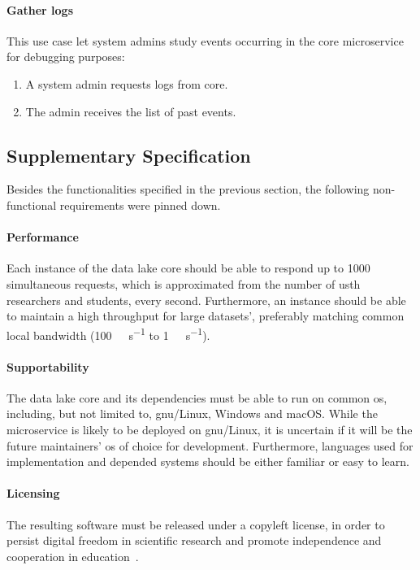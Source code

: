 \paragraph{Gather logs}  This use case let system admins study
events occurring in the core microservice for debugging purposes:
\begin{enumerate}
  \item A system admin requests logs from core.
  \item The admin receives the list of past events.
\end{enumerate}

\subsection{Supplementary Specification}
Besides the functionalities specified in the previous section,
the following non-functional requirements were pinned down.

\paragraph{Performance}  Each instance of the data lake core should be able
to respond up to 1000 simultaneous requests, which is approximated
from the number of \gls{usth} researchers and students, every second.
Furthermore, an instance should be able to maintain a high throughput
for large datasets', preferably matching common local bandwidth
(\SI{100}{\mega\bit\per\second} to \SI{1}{\giga\bit\per\second}).

\paragraph{Supportability}  The data lake core and its dependencies must
be able to run on common \gls{os}, including, but not limited to,
\acrshort{gnu}/Linux, Windows and macOS.  While the microservice is likely
to be deployed on \acrshort{gnu}/Linux, it is uncertain if it will be
the future maintainers' \gls{os} of choice for development.  Furthermore,
languages used for implementation and depended systems should be
either familiar or easy to learn.

\paragraph{Licensing}  The resulting software must be released under
a copyleft license, in order to persist digital freedom in scientific research
and promote independence and cooperation in education~\cite{libredu}.

